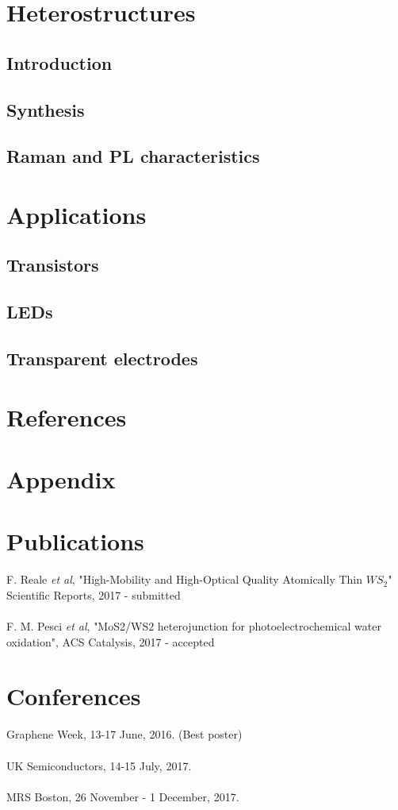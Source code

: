 \documentclass[12pt]{article}
\begin{document}
\section{Heterostructures}
	\subsection{Introduction}
	\subsection{Synthesis}
	\subsection{Raman and PL characteristics}
\section{Applications}
	\subsection{Transistors}
	\subsection{LEDs}
	\subsection{Transparent electrodes}
	
\section*{References}
\section*{Appendix}

\section*{Publications}

F. Reale \textit{et al}, "High-Mobility and High-Optical Quality Atomically Thin $WS_2$" Scientific Reports, 2017 - submitted\\ \\
F. M. Pesci \textit{et al}, "MoS2/WS2 heterojunction for photoelectrochemical water oxidation", ACS Catalysis, 2017 - accepted

\section*{Conferences}

Graphene Week, 13-17 June, 2016. (Best poster)\\ \\
UK Semiconductors, 14-15 July, 2017.\\ \\
MRS Boston, 26 November - 1 December, 2017.


{}
\end{document}
